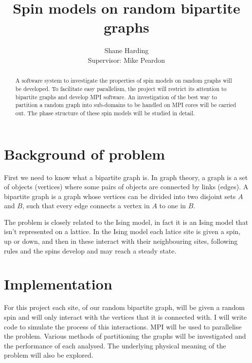 \documentclass{article}
\begin{document}
\title{Spin models on random bipartite graphs}
\author{Shane Harding \\ Supervisor: Mike Peardon}

\maketitle

\begin{abstract}
A software system to investigate the properties of spin models on random graphs will be developed. To facilitate easy parallelism, the project will restrict its attention to bipartite graphs and develop MPI software. An investigation of the best way to partition a random graph into sub-domains to be handled on MPI cores will be carried out. The phase structure of these spin models will be studied in detail.
\end{abstract}

\section{Background of problem}

First we need to know what a bipartite graph is. In graph theory, a graph is a set of objects (vertices) where some pairs of objects are connected by links (edges). A bipartite graph is a graph whose vertices can be divided into two disjoint sets $A$ and $B$, such that every edge connects a vertex in $A$ to one in $B$.

The problem is closely related to the Ising model, in fact it is an Ising model that isn't represented on a lattice. In the Ising model each latice site is given a spin, up or down, and then in these interact with their neighbouring sites, following rules and the spins develop and may reach a steady state.

\section{Implementation}

For this project each site, of our random bipartite graph, will be given a random spin and will only interact with the vertices that it is connected with. I will write code to simulate the process of this interactions. MPI will be used to parallelise the problem. Various methods of partitioning the graphs will be investigated and the performance of each analysed. The underlying physical meaning of the problem will also be explored.
\end{document}
